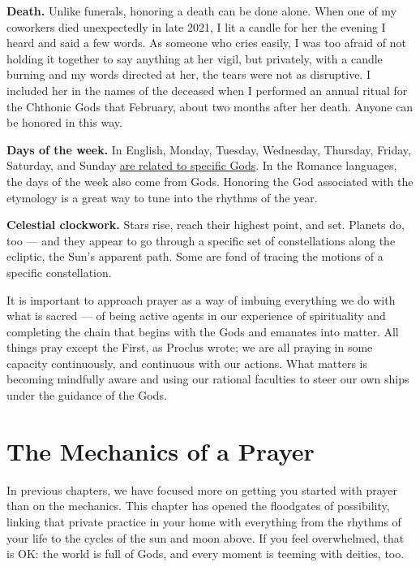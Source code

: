 \documentclass[
]{book}
\begin{document}
\textbf{Death.} Unlike funerals, honoring a death can be done alone. When one of my coworkers died unexpectedly in late 2021, I lit a candle for her the evening I heard and said a few words. As someone who cries easily, I was too afraid of not holding it together to say anything at her vigil, but privately, with a candle burning and my words directed at her, the tears were not as disruptive. I included her in the names of the deceased when I performed an annual ritual for the Chthonic Gods that February, about two months after her death. Anyone can be honored in this way.

\textbf{Days of the week.} In English, Monday, Tuesday, Wednesday, Thursday, Friday, Saturday, and Sunday \href{https://www.merriam-webster.com/words-at-play/saturday-special-word-history}{are related to specific Gods}. In the Romance languages, the days of the week also come from Gods. Honoring the God associated with the etymology is a great way to tune into the rhythms of the year.

\textbf{Celestial clockwork.} Stars rise, reach their highest point, and set. Planets do, too --- and they appear to go through a specific set of constellations along the ecliptic, the Sun's apparent path. Some are fond of tracing the motions of a specific constellation.

It is important to approach prayer as a way of imbuing everything we do with what is sacred --- of being active agents in our experience of spirituality and completing the chain that begins with the Gods and emanates into matter. All things pray except the First, as Proclus wrote; we are all praying in some capacity continuously, and continuous with our actions. What matters is becoming mindfully aware and using our rational faculties to steer our own ships under the guidance of the Gods.

\hypertarget{the-mechanics-of-a-prayer}{%
\section{The Mechanics of a Prayer}\label{the-mechanics-of-a-prayer}}

In previous chapters, we have focused more on getting you started with prayer than on the mechanics. This chapter has opened the floodgates of possibility, linking that private practice in your home with everything from the rhythms of your life to the cycles of the sun and moon above. If you feel overwhelmed, that is OK: the world is full of Gods, and every moment is teeming with deities, too.
\end{document}
